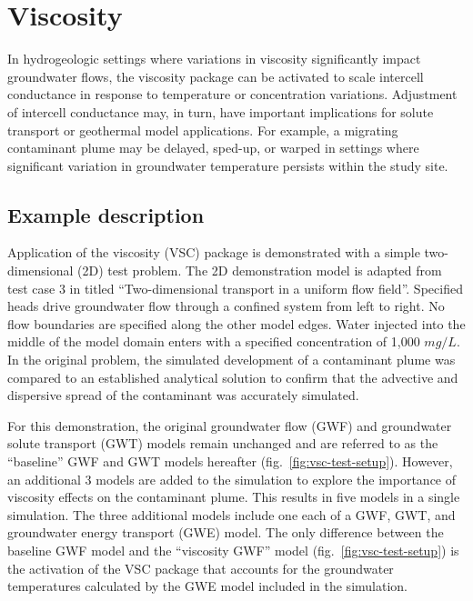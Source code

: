 \section{Viscosity}

In hydrogeologic settings where variations in viscosity significantly impact groundwater flows, the viscosity package can be activated to scale intercell conductance in response to temperature or concentration variations.  Adjustment of intercell conductance may, in turn, have important implications for solute transport or geothermal model applications.  For example, a migrating contaminant plume may be delayed, sped-up, or warped in settings where significant variation in groundwater temperature persists within the study site.

\subsection{Example description}

Application of the viscosity (VSC) package is demonstrated with a simple two-dimensional (2D) test problem.  The 2D demonstration model is adapted from test case 3 in \cite{zheng1999mt3dms} titled ``Two-dimensional transport in a uniform flow field''.  Specified heads drive groundwater flow through a confined system from left to right.  No flow boundaries are specified along the other model edges.  Water injected into the middle of the model domain enters with a specified concentration of 1,000 $mg/L$.  In the original problem, the simulated development of a contaminant plume was compared to an established analytical solution \citep{wilson1978} to confirm that the advective and dispersive spread of the contaminant was accurately simulated.

For this demonstration, the original groundwater flow (GWF) and groundwater solute transport (GWT) models remain unchanged and are referred to as the ``baseline'' GWF and GWT models hereafter (fig.~\ref{fig:vsc-test-setup}).  However, an additional 3 models are added to the \mf simulation to explore the importance of viscosity effects on the contaminant plume.  This results in five models in a single \mf simulation.  The three additional models include one each of a GWF, GWT, and groundwater energy transport (GWE) model. The only difference between the baseline GWF model and the ``viscosity GWF'' model (fig.~\ref{fig:vsc-test-setup}) is the activation of the VSC package that accounts for the groundwater temperatures calculated by the GWE model included in the simulation.

